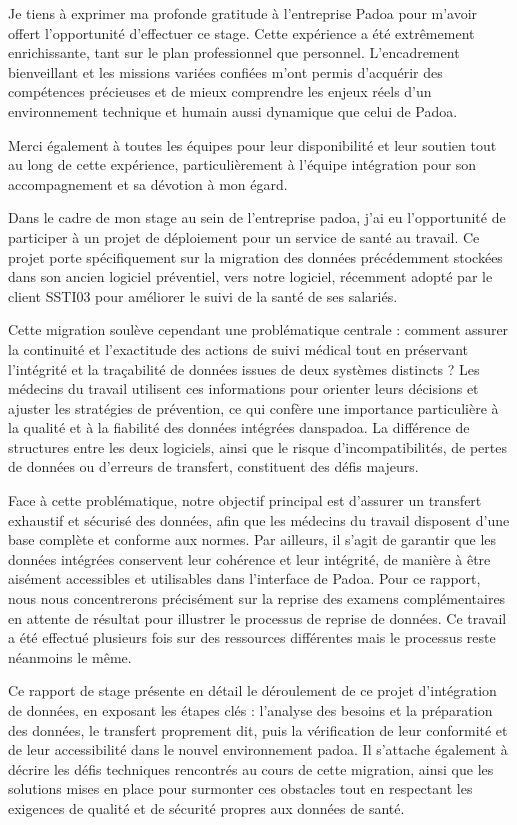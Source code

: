 
Je tiens à exprimer ma profonde gratitude à l’entreprise Padoa pour m’avoir offert l’opportunité d’effectuer ce stage. Cette expérience a été extrêmement enrichissante, tant sur le plan professionnel que personnel. L’encadrement bienveillant et les missions variées confiées m’ont permis d’acquérir des compétences précieuses et de mieux comprendre les enjeux réels d’un environnement technique et humain aussi dynamique que celui de Padoa. 

Merci également à toutes les équipes pour leur disponibilité et leur soutien tout au long de cette expérience, particulièrement à l'équipe intégration pour son accompagnement et sa dévotion à mon égard.

\smallskip

\newpage


Dans le cadre de mon stage au sein de l'entreprise padoa, j’ai eu l’opportunité de participer à un projet de déploiement pour un service de santé au travail. Ce projet porte spécifiquement sur la migration des données précédemment stockées dans son ancien logiciel préventiel, vers notre logiciel, récemment adopté par le client SSTI03 pour améliorer le suivi de la santé de ses salariés. 

Cette migration soulève cependant une problématique centrale : comment assurer la continuité et l’exactitude des actions de suivi médical tout en préservant l’intégrité et la traçabilité de données issues de deux systèmes distincts ? Les médecins du travail utilisent ces informations pour orienter leurs décisions et ajuster les stratégies de prévention, ce qui confère une importance particulière à la qualité et à la fiabilité des données intégrées danspadoa. La différence de structures entre les deux logiciels, ainsi que le risque d’incompatibilités, de pertes de données ou d’erreurs de transfert, constituent des défis majeurs. 

Face à cette problématique, notre objectif principal est d’assurer un transfert exhaustif et sécurisé des données, afin que les médecins du travail disposent d’une base complète et conforme aux normes. Par ailleurs, il s’agit de garantir que les données intégrées conservent leur cohérence et leur intégrité, de manière à être aisément accessibles et utilisables dans l’interface de Padoa.
Pour ce rapport, nous nous concentrerons précisément sur la reprise des examens complémentaires en attente de résultat pour illustrer le processus de reprise de données. Ce travail a été effectué plusieurs fois sur des ressources différentes mais le processus reste néanmoins le même. 

Ce rapport de stage présente en détail le déroulement de ce projet d’intégration de données, en exposant les étapes clés : l’analyse des besoins et la préparation des données, le transfert proprement dit, puis la vérification de leur conformité et de leur accessibilité dans le nouvel environnement padoa. Il s’attache également à décrire les défis techniques rencontrés au cours de cette migration, ainsi que les solutions mises en place pour surmonter ces obstacles tout en respectant les exigences de qualité et de sécurité propres aux données de santé.

\smallskip